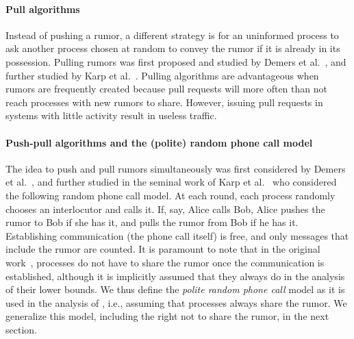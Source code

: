 \paragraph{\textbf{Pull algorithms}}

Instead of pushing a rumor, a different strategy is for an uninformed process to ask another process chosen at
random to convey the rumor if it is already in its possession. Pulling rumors was first proposed and studied
by Demers et al.~\cite{Demers:1987:EAR:41840.41841}, and further studied by Karp et
al.~\cite{DBLP:conf/focs/KarpSSV00}. 
Pulling algorithms are advantageous when rumors are frequently created because pull requests will more often than not reach processes with new rumors to share. However, issuing pull requests in systems with little activity result in useless traffic. 

\paragraph{\textbf{Push-pull algorithms and the (polite) random phone call model}}

The idea to push and pull rumors simultaneously was first considered by Demers et al.~\cite{Demers:1987:EAR:41840.41841}, and further studied in the seminal work of Karp et al.~\cite{DBLP:conf/focs/KarpSSV00} who considered the following random phone call model. At each round, each process randomly chooses an interlocutor and calls it.  If, say, Alice calls Bob, Alice pushes the rumor to Bob if she has it, and pulls the rumor from Bob if he has it. Establishing communication (the phone call itself) is free, and only messages that include the rumor are counted. It is paramount to note that in the original work~\cite{DBLP:conf/focs/KarpSSV00}, processes do not have to share the rumor once the communication is established, although it is implicitly assumed that they always do in the analysis of their lower bounds. We thus define the \emph{polite random phone call} model as it is used in the analysis of \cite{DBLP:conf/focs/KarpSSV00}, i.e., assuming that processes always share the rumor.
We generalize this model, including the right not to share the rumor, in the next section.

